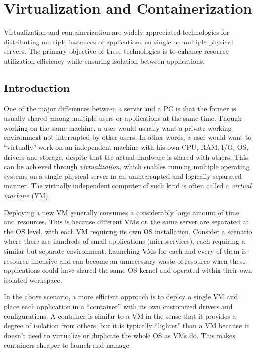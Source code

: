 \chapter{Virtualization and Containerization} \label{ch:vac}

Virtualization and containerization are widely appreciated technologies for distributing multiple instances of applications on single or multiple physical servers. The primary objective of these technologies is to enhance resource utilization efficiency while ensuring isolation between applications.

\section{Introduction}

One of the major differences between a server and a PC is that the former is usually shared among multiple users or applications at the same time. Though working on the same machine, a user would usually want a private working environment not interrupted by other users. In other words, a user would want to ``virtually'' work on an independent machine with his own CPU, RAM, I/O, OS, drivers and storage, despite that the actual hardware is shared with others. This can be achieved through \textit{virtualization}, which enables running multiple operating systems on a single physical server in an uninterrupted and logically separated manner. The virtually independent computer of such kind is often called a \textit{virtual machine} (VM).

Deploying a new VM generally consumes a considerably large amount of time and resources. This is because different VMs on the same server are separated at the OS level, with each VM requiring its own OS installation. Consider a scenario where there are hundreds of small applications (microservices), each requiring a similar but separate environment. Launching VMs for each and every of them is resource-intensive and can become an unnecessary waste of resource when these applications could have shared the same OS kernel and operated within their own isolated workspace.

In the above scenario, a more efficient approach is to deploy a single VM and place each application in a ``container'' with its own customized drivers and configurations. A container is similar to a VM in the sense that it provides a degree of isolation from others, but it is typically ``lighter'' than a VM because it doesn't need to virtualize or duplicate the whole OS as VMs do. This makes containers cheaper to launch and manage.

